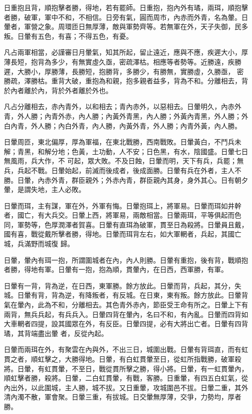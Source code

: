 \begin{pinyinscope}
 日重抱且背，順抱擊者勝，得地，若有罷師。日重抱，抱內外有璚，兩珥，順抱擊者勝，破軍，軍中不和，不相信。日旁有氣，圓而周市，內赤而外青，名為暈。日暈者，軍營之象。周環匝日無厚薄，敵與軍勢齊等。若無軍在外，天子失御，民多叛。日暈有五色，有喜；不得五色，有憂。



 凡占兩軍相當，必謹審日月暈氣，知其所起，留止遠近，應與不應，疾遲大小，厚薄長短，抱背為多少，有無實虛久亟，密疏澤枯。相應等者勢等。近勝遠，疾勝遲，大勝小，厚勝薄，長勝短，抱勝背，多勝少，有勝無，實勝虛，久勝亟，
 密勝疏，澤勝枯。重背大破，重抱為和親，抱多親者益多，背為不和。分離相去，背於內者離於內，背於外者離於外也。



 凡占分離相去，赤內青外，以和相去；青內赤外，以惡相去。日暈明久，內赤外青，外人勝；內青外赤，內人勝；內黃外青黑，內人勝；外黃內青黑，外人勝；外白內青，外人勝；內白外青，內人勝，內黃外青，外人勝；內青外黃，內人勝。



 日暈周匝，東北偏厚，厚為軍福，在東北戰勝，西南戰敗。日暈黃白，不鬥兵未解；青黑，和解分地；色黃，土功動，人不安；日色黑，有水，陰國盛。日暈七日無風雨，兵大作，不
 可起，眾大敗。不及日蝕，日暈而明，天下有兵，兵罷；無兵，兵起不戰。日暈始起，前滅而後成者，後成面勝。日暈有兵在外者，主人不勝。日暈，內赤外青，群臣親外；外赤內青，群臣親內其身，身外其心。日有朝夕暈，是謂失地，主人必敗。



 日暈而珥，主有謀，軍在外，外軍有悔。日暈抱珥上，將軍易。日暈而珥如井幹者，國亡，有大兵交。日暈上西，將軍易，兩敵相當。日暈兩珥，平等俱起而色同，軍勢等，色厚潤澤者賀喜。日暈有直珥為破軍，貫至日為殺將。日暈員且戴，國有喜，戰從戴所擊者勝，得地。日暈而珥背左右，如大軍輞者，兵起，其國亡城，兵滿野而城復
 歸。



 日暈，暈內有珥一抱，所謂圍城者在內，內人則勝。日暈有重抱，後有背，戰順抱者勝，得地有軍。日暈有一抱，抱為順，貫暈內，在日西，西軍勝，有軍。



 日暈有一背，背為逆，在日西，東軍勝。餘方放此。日暈而背，兵起，其分，失城。日暈有背，背為逆，有降叛者，有反城。在日東，東有叛。餘方放此。日暈背氣在暈內，此為不和，分離相去。其色青外赤內，節臣受王命有所之。日暈上下有兩背，無兵兵起，有兵兵入。日暈四背在暈內，名曰不和，有內亂。日暈而四背如大車輞者四提，設其國眾在外，有反臣。日暈四提，必有大將出亡者。日暈有四背璚，其背端盡出暈
 者，反從內起。



 日暈而兩珥在外，有聚雲在內與外，不出三日，城圍出戰。日暈有背珥直，而有虹貫之者，順虹擊之，大勝得地。日暈，有白虹貫暈至日，從虹所指戰勝，破軍殺將。日暈，有虹貫暈，不至日，戰從貫所擊之勝，得小將。日暈，有一虹貫暈內，順虹擊者勝，殺將。日暈，二白虹貫暈，有戰，客勝。日重暈，有四五白虹氣，從內出外，以此圍城，主人勝，城不拔。又日重暈，攻城圍邑不拔。日暈二重，其外清內濁不散，軍會聚。日暈三重，有拔城。日交暈無厚薄，交爭，力勢均，厚者勝。




\end{pinyinscope}
